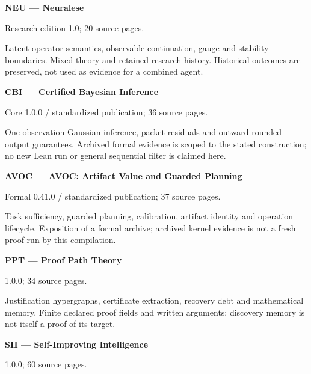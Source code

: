 \hypertarget{cat:NEU}{}\textbf{NEU --- Neuralese}\par

Research edition 1.0; 20 source pages.\par

Latent operator semantics, observable continuation, gauge and stability boundaries. Mixed theory and retained research history. Historical outcomes are preserved, not used as evidence for a combined agent.\par

\hypertarget{cat:CBI}{}\textbf{CBI --- Certified Bayesian Inference}\par

Core 1.0.0 / standardized publication; 36 source pages.\par

One-observation Gaussian inference, packet residuals and outward-rounded output guarantees. Archived formal evidence is scoped to the stated construction; no new Lean run or general sequential filter is claimed here.\par

\hypertarget{cat:AVOC}{}\textbf{AVOC --- AVOC: Artifact Value and Guarded Planning}\par

Formal 0.41.0 / standardized publication; 37 source pages.\par

Task sufficiency, guarded planning, calibration, artifact identity and operation lifecycle. Exposition of a formal archive; archived kernel evidence is not a fresh proof run by this compilation.\par

\hypertarget{cat:PPT}{}\textbf{PPT --- Proof Path Theory}\par

1.0.0; 34 source pages.\par

Justification hypergraphs, certificate extraction, recovery debt and mathematical memory. Finite declared proof fields and written arguments; discovery memory is not itself a proof of its target.\par

\hypertarget{cat:SII}{}\textbf{SII --- Self-Improving Intelligence}\par

1.0.0; 60 source pages.\par

